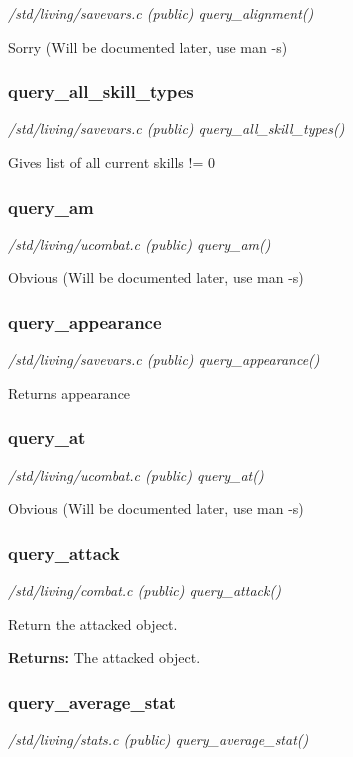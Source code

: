 {\em /std/living/savevars.c (public) query\_alignment()}

Sorry (Will be documented later, use man -s)


\subsubsection{query\_all\_skill\_types}

{\em /std/living/savevars.c (public) query\_all\_skill\_types()}

Gives list of all current skills != 0


\subsubsection{query\_am}

{\em /std/living/ucombat.c (public) query\_am()}

Obvious (Will be documented later, use man -s)


\subsubsection{query\_appearance}

{\em /std/living/savevars.c (public) query\_appearance()}

Returns appearance


\subsubsection{query\_at}

{\em /std/living/ucombat.c (public) query\_at()}

Obvious (Will be documented later, use man -s)


\subsubsection{query\_attack}

{\em /std/living/combat.c (public) query\_attack()}

Return the attacked object.

{\bf Returns:}        The attacked object.


\subsubsection{query\_average\_stat}

{\em /std/living/stats.c (public) query\_average\_stat()}

